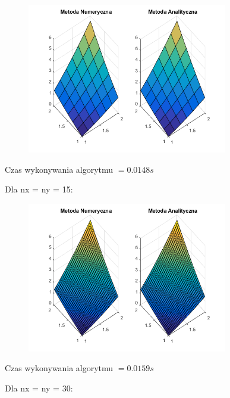 \begin{figure}[!ht]
	\begin{center}
		\includegraphics[width=0.78\textwidth]{Lab5/charts/zad3/5x5.png}
	\end{center}
\end{figure}

Czas wykonywania algorytmu $ = 0.0148 s$

Dla nx = ny = 15:

\begin{figure}[!ht]
	\begin{center}
		\includegraphics[width=0.78\textwidth]{Lab5/charts/zad3/15x15.png}
	\end{center}
\end{figure}

Czas wykonywania algorytmu $ = 0.0159 s$

\newpage
Dla nx = ny = 30:


